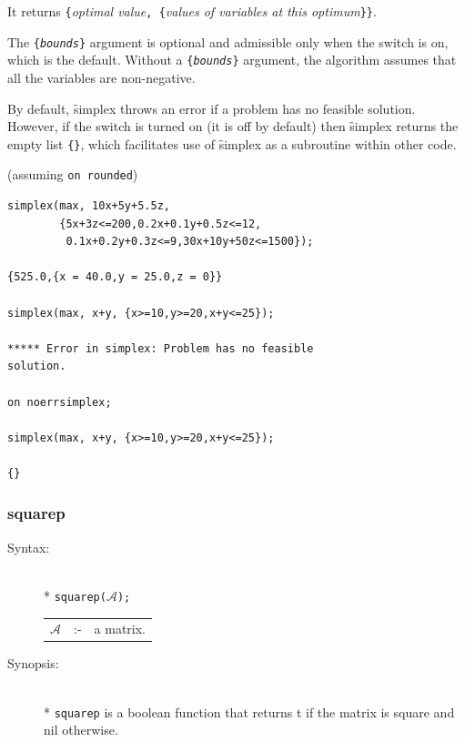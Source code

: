 {\begin{description}
It returns \texttt{\{}\emph{optimal value}\texttt{, \{}\emph{values of
variables at this optimum}\texttt{\}\}}.

\hypertarget{switch:FASTSIMPLEX}{}
The \texttt{\{\emph{bounds}\}} argument is optional and admissible
only when the switch  is on, which is the default.
Without a \texttt{\{\emph{bounds}\}} argument, the algorithm assumes
that all the variables are non-negative.

\hypertarget{switch:NOERRSIMPLEX}{}
By default, \f{simplex} throws an error if a problem has no feasible
solution.  However, if the switch  is turned on (it
is off by default) then \f{simplex} returns the empty list
\texttt{\{\}}, which facilitates use of \f{simplex} as a subroutine
within other code.

\item[Examples:] (assuming \texttt{on rounded}) \\
\begin{verbatim}
simplex(max, 10x+5y+5.5z,
        {5x+3z<=200,0.2x+0.1y+0.5z<=12,
         0.1x+0.2y+0.3z<=9,30x+10y+50z<=1500});

{525.0,{x = 40.0,y = 25.0,z = 0}}

simplex(max, x+y, {x>=10,y>=20,x+y<=25});

***** Error in simplex: Problem has no feasible
solution.

on noerrsimplex;

simplex(max, x+y, {x>=10,y>=20,x+y<=25});

{}
\end{verbatim}
\end{description}


\subsubsection{squarep}
\label{linalg:squarep}
\hypertarget{operator:SQUAREP}{}

\begin{description}
\item[Syntax:]\mbox{}\\*
{\tt squarep($\mathcal{A}$);}\\[2mm]
\begin{tabular}{l l l}
$\mathcal{A}$ &:-& a matrix.
\end{tabular}

\item[Synopsis:]\mbox{}\\*
\texttt{squarep} is a boolean function that returns t if
                the matrix is square and nil otherwise.


\end{description}}
